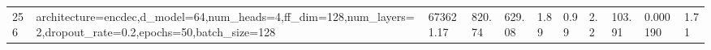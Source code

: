 \begin{longtable}{C{0.8cm} L{2cm} C{1.15cm} C{1.15cm} C{1.15cm} C{1.15cm} C{0.85cm} C{1.25cm} C{1.2cm} C{1.5cm} C{1.0cm}}
256 & architecture=encdec,\newline d\_model=64,\newline num\_heads=4,\newline ff\_dim=128,\newline num\_layers=2,\newline dropout\_rate=0.2,\newline epochs=50,\newline batch\_size=128 & 673621.17 & 820.74 & 629.08 & 1.89 & 0.99 & 2.2 & 103.91 & 0.000190 & 1.71 \\
\end{longtable}
\endgroup


